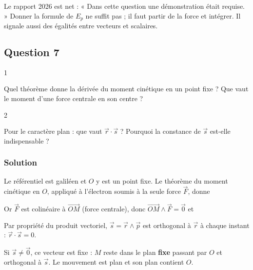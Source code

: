 \documentclass[11pt,a4paper]{article}
\newcommand{\equationajustee}[1]{%
  \sbox{\boiteequation}{$\displaystyle #1$}%
  \ifdim\wd\boiteequation>\linewidth
    \[\resizebox{\linewidth}{!}{\usebox{\boiteequation}}\]%
  \else
    \[#1\]%
  \fi}
\begin{document}
\begin{jury}

Le rapport 2026 est net : « Dans cette question une démonstration était requise. » Donner la formule de \(E_p\) ne suffit pas ; il faut partir de la force et intégrer. Il signale aussi des égalités entre vecteurs et scalaires.

\end{jury}

\hypertarget{question-7}{%
\subsection{Question 7}\label{question-7}}

\begin{indication}{1}

Quel théorème donne la dérivée du moment cinétique en un point fixe ? Que vaut le moment d'une force centrale en son centre ?

\end{indication}

\begin{indication}{2}

Pour le caractère plan : que vaut \(\vec r\cdot\vec s\) ? Pourquoi la constance de \(\vec s\) est-elle indispensable ?

\end{indication}

\hypertarget{solution-6}{%
\subsubsection{Solution}\label{solution-6}}

Le référentiel est galiléen et \(O\) y est un point fixe. Le théorème du moment cinétique en \(O\), appliqué à l'électron soumis à la seule force \(\vec F\), donne

\equationajustee{\frac{d\vec s}{dt}=\overrightarrow{OM}\wedge\vec F .}

Or \(\vec F\) est colinéaire à \(\overrightarrow{OM}\) (force centrale), donc \(\overrightarrow{OM}\wedge\vec F=\vec 0\) et

\equationajustee{\boxed{\vec s=\vec r\wedge\vec p=\overrightarrow{\text{cte}}}}

Par propriété du produit vectoriel, \(\vec s=\vec r\wedge\vec p\) est orthogonal à \(\vec r\) à chaque instant : \(\vec r\cdot\vec s=0\).

Si \(\vec s\neq\vec0\), ce vecteur est fixe : \(M\) reste dans le plan \textbf{fixe} passant par \(O\) et orthogonal à \(\vec s\). Le mouvement est plan et son plan contient \(O\).
\end{document}
